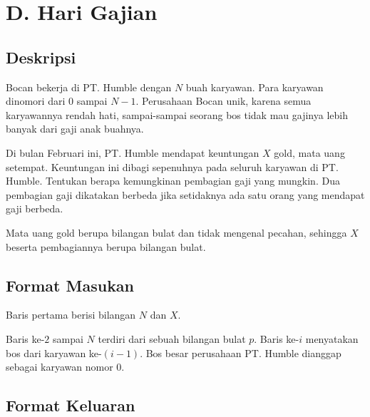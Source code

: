 \documentclass{article}
\begin{document}
\section*{\hfil D. Hari Gajian\hfil}


\subsection*{Deskripsi}

\par\noindent Bocan bekerja di PT. Humble dengan $N$ buah karyawan. Para karyawan dinomori dari $0$ sampai $N-1$. Perusahaan Bocan unik, karena semua karyawannya rendah hati, sampai-sampai seorang bos tidak mau gajinya lebih banyak dari gaji anak buahnya.

\par\noindent Di bulan Februari ini, PT. Humble mendapat keuntungan $X$ gold, mata uang setempat. Keuntungan ini dibagi sepenuhnya pada seluruh karyawan di PT. Humble. Tentukan berapa kemungkinan pembagian gaji yang mungkin. Dua pembagian gaji dikatakan berbeda jika setidaknya ada satu orang yang mendapat gaji berbeda.

\par\noindent Mata uang gold berupa bilangan bulat dan tidak mengenal pecahan, sehingga $X$ beserta pembagiannya berupa bilangan bulat.

\subsection*{Format Masukan}

\par\noindent Baris pertama berisi bilangan $N$ dan $X$.
\par\noindent Baris ke-$2$ sampai $N$ terdiri dari sebuah bilangan bulat $p$. Baris ke-$i$ menyatakan bos dari karyawan ke-$(i-1)$. Bos besar perusahaan PT. Humble dianggap sebagai karyawan nomor $0$.

\subsection*{Format Keluaran}
\end{document}
